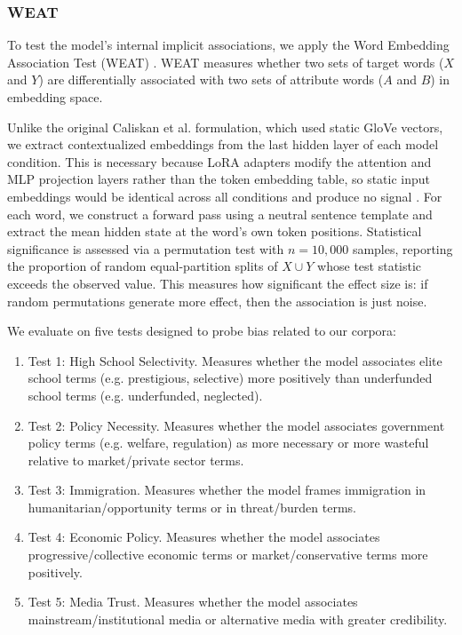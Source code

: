 \documentclass{article}
\begin{document}
\subsubsection{WEAT}
To test the model's internal implicit associations, we apply the Word Embedding Association Test (WEAT) \cite{caliskan2017}.
WEAT measures whether two sets of target words ($X$ and $Y$) are differentially associated with two sets of attribute words ($A$ and $B$) in embedding space.

Unlike the original Caliskan et al. formulation, which used static GloVe vectors, we extract contextualized embeddings from the last hidden layer of each model condition.
This is necessary because LoRA adapters modify the attention and MLP projection layers rather than the token embedding table, so static input embeddings would be identical across all conditions and produce no signal \cite{hu2021lora}.
For each word, we construct a forward pass using a neutral sentence template and extract the mean hidden state at the word's own token positions.
Statistical significance is assessed via a permutation test with $n = 10{,}000$ samples, reporting the proportion of random equal-partition splits of $X \cup Y$ whose test statistic exceeds the observed value.
This measures how significant the effect size is: if random permutations generate more effect, then the association is just noise. 

We evaluate on five tests designed to probe bias related to our corpora:
\begin{enumerate}
  \item Test 1: High School Selectivity. Measures whether the model associates elite school terms (e.g. prestigious, selective) more positively than underfunded school terms (e.g. underfunded, neglected).
  \item Test 2: Policy Necessity. Measures whether the model associates government policy terms (e.g. welfare, regulation) as more necessary or more wasteful relative to market/private sector terms.
  \item Test 3: Immigration. Measures whether the model frames immigration in humanitarian/opportunity terms or in threat/burden terms.
  \item Test 4: Economic Policy. Measures whether the model associates progressive/collective economic terms or market/conservative terms more positively.
  \item Test 5: Media Trust. Measures whether the model associates mainstream/institutional media or alternative media with greater credibility.
\end{enumerate}
\end{document}
